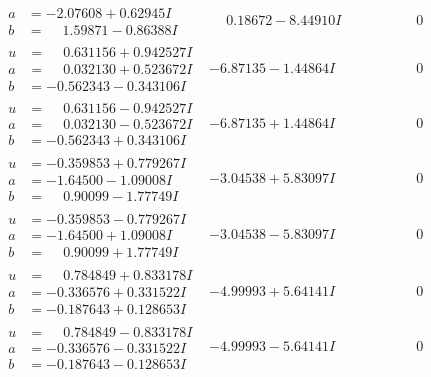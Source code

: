 \documentclass[1p]{elsarticle_modified}
\theoremstyle{definition}
\begin{document}
$$\begin{array}{c|c|c}
\begin{aligned}
a &= -2.07608 + 0.62945 I \\
b &= \phantom{-}1.59871 - 0.86388 I\end{aligned}
 & \phantom{-}0.18672 - 8.44910 I & \phantom{-0.000000 } 0 \\ \hline\begin{aligned}
u &= \phantom{-}0.631156 + 0.942527 I \\
a &= \phantom{-}0.032130 + 0.523672 I \\
b &= -0.562343 - 0.343106 I\end{aligned}
 & -6.87135 - 1.44864 I & \phantom{-0.000000 } 0 \\ \hline\begin{aligned}
u &= \phantom{-}0.631156 - 0.942527 I \\
a &= \phantom{-}0.032130 - 0.523672 I \\
b &= -0.562343 + 0.343106 I\end{aligned}
 & -6.87135 + 1.44864 I & \phantom{-0.000000 } 0 \\ \hline\begin{aligned}
u &= -0.359853 + 0.779267 I \\
a &= -1.64500 - 1.09008 I \\
b &= \phantom{-}0.90099 - 1.77749 I\end{aligned}
 & -3.04538 + 5.83097 I & \phantom{-0.000000 } 0 \\ \hline\begin{aligned}
u &= -0.359853 - 0.779267 I \\
a &= -1.64500 + 1.09008 I \\
b &= \phantom{-}0.90099 + 1.77749 I\end{aligned}
 & -3.04538 - 5.83097 I & \phantom{-0.000000 } 0 \\ \hline\begin{aligned}
u &= \phantom{-}0.784849 + 0.833178 I \\
a &= -0.336576 + 0.331522 I \\
b &= -0.187643 + 0.128653 I\end{aligned}
 & -4.99993 + 5.64141 I & \phantom{-0.000000 } 0 \\ \hline\begin{aligned}
u &= \phantom{-}0.784849 - 0.833178 I \\
a &= -0.336576 - 0.331522 I \\
b &= -0.187643 - 0.128653 I\end{aligned}
 & -4.99993 - 5.64141 I & \phantom{-0.000000 } 0 \\ \hline\begin{aligned}

\end{aligned}
\end{array}$$
\end{document}
